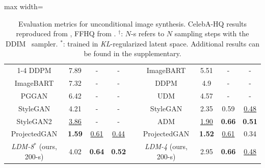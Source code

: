 {\begin{table}[t]
\begin{footnotesize}
\begin{adjustbox}{max width=\linewidth}
\begin{tabular}{c c c c c c c c c}
    \cmidrule{1-4} \cmidrule{6-9}
	DDPM \cite{DBLP:conf/nips/HoJA20} & 7.89 & - & - & &ImageBART \cite{DBLP:journals/corr/abs-2108-08827} & 5.51 & -&- \\
    ImageBART\cite{DBLP:journals/corr/abs-2108-08827} & 7.32 & - & - & &  DDPM \cite{DBLP:conf/nips/HoJA20} &4.9 &- &- \\
    PGGAN \cite{DBLP:journals/corr/abs-1710-10196} & 6.42 & - & - & & UDM \cite{DBLP:journals/corr/abs-2106-05527} & 4.57 & -&-\\
    StyleGAN\cite{stylegan} & 4.21 & - & - & &  StyleGAN\cite{stylegan} & 2.35 & 0.59 &  \underline{0.48} \\
    StyleGAN2\cite{DBLP:journals/corr/abs-1912-04958} & \underline{3.86} & - & - &  & ADM \cite{DBLP:journals/corr/abs-2105-05233} & \underline{1.90} & \textbf{0.66} & \textbf{0.51} \\
    ProjectedGAN\cite{DBLP:journals/corr/abs-2111-01007} & \textbf{1.59} & \underline{0.61} & \underline{0.44} & & ProjectedGAN\cite{DBLP:journals/corr/abs-2111-01007} & \textbf{1.52} & \underline{0.61} & 0.34\\
    \midrule
    \emph{LDM-8}$^*$ (ours, 200-s) & 4.02 & \textbf{0.64} & \textbf{0.52} & & \emph{LDM-4} (ours, 200-s) & 2.95 & \textbf{0.66} & \underline{0.48} \\
    \bottomrule
  \end{tabular}
  \end{adjustbox}\vspace{-2.6em}
\end{footnotesize}
  \caption{\label{tab:fids} Evaluation metrics for unconditional image
  synthesis. CelebA-HQ results reproduced from
  \cite{DBLP:conf/cvpr/ParmarLLT21,DBLP:conf/iclr/XiaoKKV21,DBLP:journals/corr/abs-2106-05527},
  FFHQ from
  \cite{DBLP:journals/corr/abs-1912-04958,DBLP:journals/corr/abs-2106-05527}. $^\dagger$: $N$-s refers to $N$ sampling steps with the DDIM~\cite{DBLP:conf/iclr/SongME21} sampler. $^*$: trained in \emph{KL}-regularized latent space.
  Additional results can be found in the supplementary.\vspace{-1.6em}}
\end{table}
}




